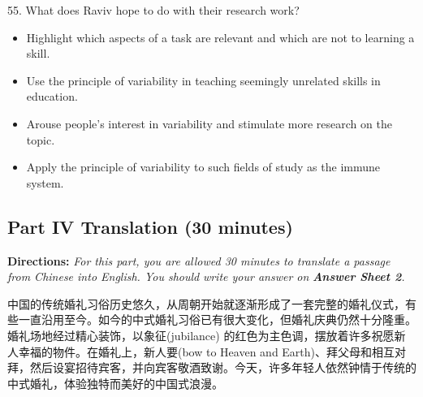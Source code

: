 \documentclass[UTF8,11pt]{ctexart}
\begin{document}
55. What does Raviv hope to do with their research work?


\begin{itemize}[leftmargin=2em,itemsep=.2em,topsep=.4em]\item[A.] Highlight which aspects of a task are relevant and which are not to learning a skill.
\item[B.] Use the principle of variability in teaching seemingly unrelated skills in education.
\item[C.] Arouse people’s interest in variability and stimulate more research on the topic.
\item[D.] Apply the principle of variability to such fields of study as the immune system.
\end{itemize}

\subsection*{\textbf{Part IV Translation} \textbf{(30 minutes)}}


\textbf{Directions: }\textit{For this part, you are allowed 30 minutes to translate a passage from Chinese into English. You should} \textit{write your answer on }\textbf{\textit{Answer Sheet 2}}\textit{.}


中国的传统婚礼习俗历史悠久，从周朝开始就逐渐形成了一套完整的婚礼仪式，有些一直沿用至今。如今的中式婚礼习俗已有很大变化，但婚礼庆典仍然十分隆重。婚礼场地经过精心装饰，以象征(jubilance) 的红色为主色调，摆放着许多祝愿新人幸福的物件。在婚礼上，新人要(bow to Heaven and Earth)、拜父母和相互对拜，然后设宴招待宾客，并向宾客敬酒致谢。今天，许多年轻人依然钟情于传统的中式婚礼，体验独特而美好的中国式浪漫。
\end{document}
